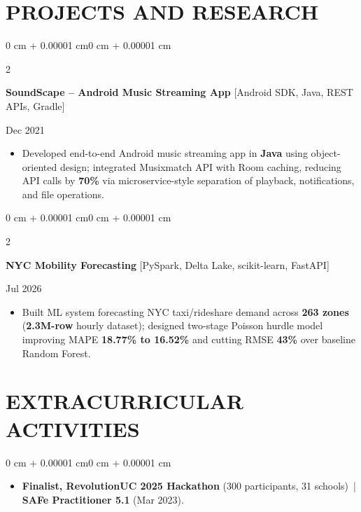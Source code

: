 \documentclass[10pt, letterpaper]{article}
\newenvironment{highlights}{
    \begin{itemize}[
        topsep=0.10 cm,
        parsep=0.06 cm,
        partopsep=0pt,
        itemsep=0.06 cm,
        leftmargin=12pt
    ]
}{
    \end{itemize}
}
\newenvironment{onecolentry}{
    \begin{adjustwidth}{0 cm + 0.00001 cm}{0 cm + 0.00001 cm}
}{
    \end{adjustwidth}
}
\newenvironment{twocolentry}[2][]{
    \onecolentry
    \def\secondColumn{#2}
    \setcolumnwidth{\fill, 4.5 cm}
    \begin{paracol}{2}
}{
    \switchcolumn \raggedleft \secondColumn
    \end{paracol}
    \endonecolentry
}
\begin{document}
\section{PROJECTS AND RESEARCH}
\begin{twocolentry}{Dec 2021}
\textbf{SoundScape -- Android Music Streaming App} [Android SDK, Java, REST APIs, Gradle]
\end{twocolentry}
\begin{highlights}
  \item Developed end-to-end Android music streaming app in \textbf{Java} using object-oriented design; integrated Musixmatch API with Room caching, reducing API calls by \textbf{70\%} via microservice-style separation of playback, notifications, and file operations.
\end{highlights}

\vspace{0.12 cm}

\begin{twocolentry}{Jul 2026}
\textbf{NYC Mobility Forecasting} [PySpark, Delta Lake, scikit-learn, FastAPI]
\end{twocolentry}
\begin{highlights}
  \item Built ML system forecasting NYC taxi/rideshare demand across \textbf{263 zones} (\textbf{2.3M-row} hourly dataset); designed two-stage Poisson hurdle model improving MAPE \textbf{18.77\% to 16.52\%} and cutting RMSE \textbf{43\%} over baseline Random Forest.
\end{highlights}

\section{EXTRACURRICULAR ACTIVITIES}
\begin{onecolentry}
\begin{highlights}
  \item \textbf{Finalist, RevolutionUC 2025 Hackathon} (300 participants, 31 schools) \,|\, \textbf{SAFe Practitioner 5.1} (Mar 2023).
\end{highlights}
\end{onecolentry}
\end{document}
